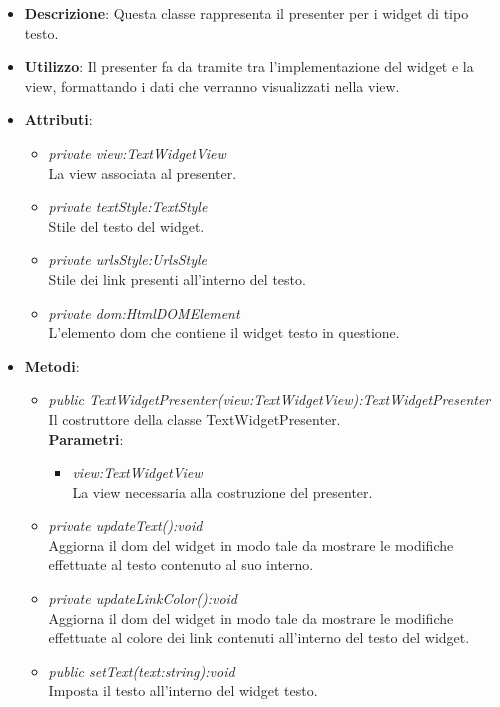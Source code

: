\begin{itemize}
\item \textbf{Descrizione}: Questa classe rappresenta il presenter per i widget di tipo testo.
\item \textbf{Utilizzo}: Il presenter fa da tramite tra l'implementazione del widget e la view,  formattando i dati che verranno visualizzati nella view.
\item \textbf{Attributi}:
	\begin{itemize}
	\item \textit{private view:TextWidgetView}\\
	La view associata al presenter.
	\item \textit{private textStyle:TextStyle}\\
	Stile del testo del widget.
	\item \textit{private urlsStyle:UrlsStyle}\\
	Stile dei link presenti all'interno del testo.
	\item \textit{private dom:HtmlDOMElement}\\
	L'elemento dom che contiene il widget testo in questione.
	\end{itemize}
\item \textbf{Metodi}:
	\begin{itemize}
	\item \textit{public TextWidgetPresenter(view:TextWidgetView):TextWidgetPresenter}\\
	Il costruttore della classe TextWidgetPresenter.
		\\ \textbf{Parametri}: \begin{itemize}
		\item \textit{view:TextWidgetView}\\
		La view necessaria alla costruzione del presenter.
		\end{itemize} 
	\item \textit{private updateText():void}\\
	Aggiorna il dom del widget in modo tale da mostrare le modifiche effettuate al testo contenuto al suo interno.
	\item \textit{private updateLinkColor():void}\\
	Aggiorna il dom del widget in modo tale da mostrare le modifiche effettuate al colore dei link contenuti all'interno del testo del widget.
	\item \textit{public setText(text:string):void}\\
	Imposta il testo all'interno del widget testo.

\end{itemize}
\end{itemize}
